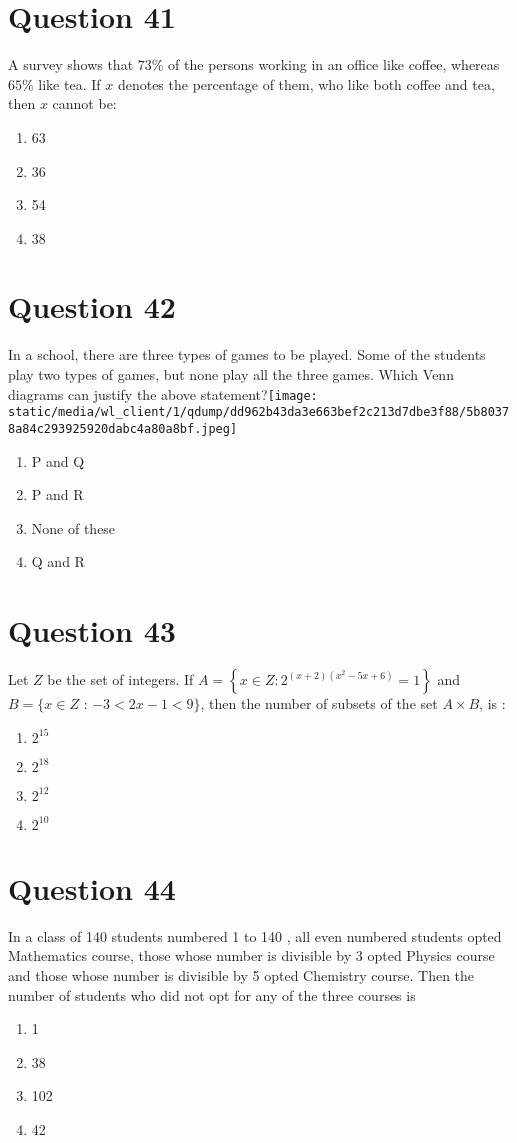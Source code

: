 \documentclass{article}
\begin{document}
\section*{Question 41}
A survey shows that \(73 \%\) of the persons working in an office like coffee, whereas \(65 \%\) like tea. If \(x\) denotes the percentage of them, who like both coffee and tea, then \(x\) cannot be: 
\begin{enumerate}[label=(\alph*)]
\item 63
\item 36
\item 54
\item 38
\end{enumerate}
\newpage
\section*{Question 42}
In a school, there are three types of games to be played. Some of the students play two types of games, but none play all the three games. Which Venn diagrams can justify the above statement?\texttt{[image: static/media/wl\_client/1/qdump/dd962b43da3e663bef2c213d7dbe3f88/5b80378a84c293925920dabc4a80a8bf.jpeg]}\newline
\begin{enumerate}[label=(\alph*)]
\item P and Q
\item P and R
\item None of these
\item Q and R
\end{enumerate}
\newpage
\section*{Question 43}
Let \(Z\) be the set of integers. If \(A=\left\{x \in Z: 2^{(x+2)\left(x^2-5 x+6\right)}=1\right\}\) and \(B =\{x \in Z\) : \(-3<2 x-1<9\}\), then the number of subsets of the set \(A \times B\), is : 
\begin{enumerate}[label=(\alph*)]
\item \(2^{15}\)
\item \(2^{18}\)
\item \(2^{12}\)
\item \(2^{10}\)
\end{enumerate}
\newpage
\section*{Question 44}
In a class of 140 students numbered 1 to 140 , all even numbered students opted Mathematics course, those whose number is divisible by 3 opted Physics course and those whose number is divisible by 5 opted Chemistry course. Then the number of students who did not opt for any of the three courses is  
\begin{enumerate}[label=(\alph*)]
\item 1
\item 38
\item 102
\item 42
\end{enumerate}
\newpage
\end{document}
